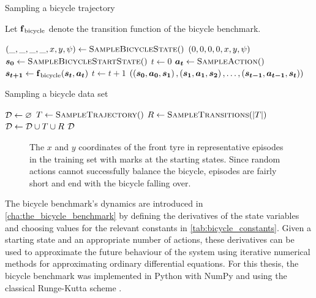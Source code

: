 \begin{algorithm}[p]
    \caption{Sampling a bicycle trajectory}
    \label{alg:bicycle_trajectories}
    Let $\DynBicycle$ denote the transition function of the bicycle benchmark.
    \begin{algorithmic}[1]
            \State $\Bicycle*{\_, \_, \_, \_, x, y, \psi} \gets \Call{SampleBicycleState}$
            \State \Return $\Bicycle*{0, 0, 0, 0, x, y, \psi}$
        \EndFunction
        \Statex
            \State $\mat{s_0} \gets \Call{SampleBicycleStartState}$
            \State $t \gets 0$
                \State $\mat{a_t} \gets \Call{SampleAction}$
                \State $\mat{s_{t+1}} \gets \DynBicycle(\mat{s_t}, \mat{a_t})$
                \State $t \gets t + 1$
            \EndWhile
            \State \Return $\left( \left( \mat{s_0}, \mat{a_0}, \mat{s_1} \right), \left( \mat{s_1}, \mat{a_1}, \mat{s_2} \right), \dots, \left( \mat{s_{t-1}}, \mat{a_{t-1}}, \mat{s_t} \right) \right)$
        \EndFunction
    \end{algorithmic}
\end{algorithm}
\begin{algorithm}[p]
    \caption{Sampling a bicycle data set}
    \label{alg:bicycle_data_set}
    \begin{algorithmic}[1]
            \State $\D \gets \emptyset$
                \State $T \gets \Call{SampleTrajectory}$
                \State $R \gets \Call{SampleTransitions}{\abs{T}}$
                \State $\D \gets \D \cup T \cup R$
            \EndWhile
            \State \Return $\D$
        \EndFunction
    \end{algorithmic}
\end{algorithm}
\begin{figure}[p]
    \centering
    \caption[Episodes in the training set]{
        The $x$ and $y$ coordinates of the front tyre in representative episodes in the training set with marks at the starting states.
        Since random actions cannot successfully balance the bicycle, episodes are fairly short and end with the bicycle falling over.
    }
    \label{fig:data_set_plot}
\end{figure}
The bicycle benchmark's dynamics are introduced in \cref{cha:the_bicycle_benchmark} by defining the derivatives of the state variables and choosing values for the relevant constants in \cref{tab:bicycle_constants}.
Given a starting state and an appropriate number of actions, these derivatives can be used to approximate the future behaviour of the system using iterative numerical methods for approximating ordinary differential equations.
For this thesis, the bicycle benchmark was implemented in Python \cite{van_rossum_python_1995} with NumPy \cite{walt_numpy_2011} and using the classical Runge-Kutta scheme \cite{kutta_beitrag_1901}.

